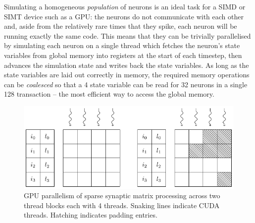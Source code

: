 \documentclass[utf8]{frontiersSCNS} %
\begin{document}
Simulating a homogeneous \textit{population} of neurons is an ideal task for a SIMD or SIMT device such as a GPU: the neurons do not communicate with each other and, aside from the relatively rare times that they spike, each neuron will be running exactly the same code.
This means that they can be trivially parallelised by simulating each neuron on a single thread which fetches the neuron's state variables from global memory into registers at the start of each timestep, then advances the simulation state and writes back the state variables.
As long as the state variables are laid out correctly in memory, the required memory operations can be \textit{coalesced} so that a \SI{4}{\byte} state variable can be read for \num{32} neurons in a single \SI{128}{\byte} transaction -- the most efficient way to access the global memory.

\begin{figure}
    \begin{center}
        \includegraphics[width=118mm]{figures/ragged_matrix}
    \end{center}
    \caption{GPU parallelism of sparse synaptic matrix processing across two thread blocks each with \num{4} threads.
    Snaking lines indicate CUDA threads.
    Hatching indicates padding entries.}
    \label{fig:ragged_matrix}
\end{figure}
\end{document}
